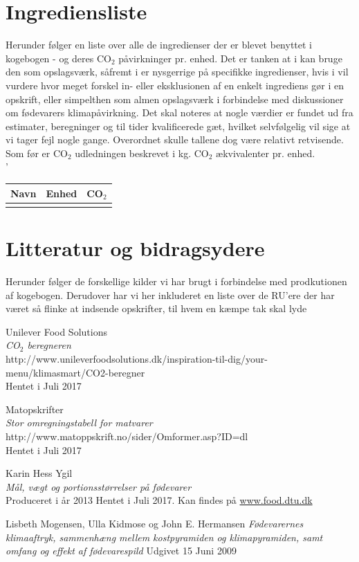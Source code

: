 \documentclass[11pt, a4paper]{article}
\newcommand{\coo}{CO$_2$ }
\begin{document}
\newpage

\section{Ingrediensliste}

Herunder følger en liste over alle de ingredienser der er blevet benyttet i kogebogen - og deres \coo påvirkninger pr. enhed. Det er tanken at i kan bruge den som opslagsværk, såfremt i er nysgerrige på specifikke ingredienser, hvis i vil vurdere hvor meget forskel in- eller eksklusionen af en enkelt ingrediens gør i en opskrift, eller simpelthen som almen opslagsværk i forbindelse med diskussioner om fødevarers klimapåvirkning. Det skal noteres at nogle værdier er fundet ud fra estimater, beregninger og til tider kvalificerede gæt, hvilket selvfølgelig vil sige at vi tager fejl nogle gange. Overordnet skulle tallene dog være relativt retvisende. Som før er \coo udledningen beskrevet i kg. \coo ækvivalenter pr. enhed.\\



'
	
	\begin{longtable}{|l|l|l|}
		\hline
\textbf{Navn} & \textbf{Enhed} & \textbf{\coo}\\ \hline
\rucooingredients		
	\end{longtable}

\newpage
\section{Litteratur og bidragsydere}

Herunder følger de forskellige kilder vi har brugt i forbindelse med prodkutionen af kogebogen. Derudover har vi her inkluderet en liste over de RU'ere der har været så flinke at indsende opskrifter, til hvem en kæmpe tak skal lyde

\begin{thebibliography}{9}
	Unilever Food Solutions\\
	\textit{\coo beregneren}\\
	http://www.unileverfoodsolutions.dk/inspiration-til-dig/your-menu/klimasmart/CO2-beregner\\
	Hentet i Juli 2017
	
	Matopskrifter\\
	\textit{Stor omregningstabell for matvarer}\\
	http://www.matoppskrift.no/sider/Omformer.asp?ID=dl\\
	Hentet i Juli 2017
	
 Karin Hess Ygil\\
	\textit{Mål, vægt og portionsstørrelser på fødevarer}\\
	Produceret i år 2013
	Hentet i Juli 2017. Kan findes på \url{www.food.dtu.dk}
	
	Lisbeth Mogensen, Ulla Kidmose og John E. Hermansen
	\textit{Fødevarernes klimaaftryk,
		sammenhæng mellem kostpyramiden og klimapyramiden,
		samt omfang og effekt af fødevarespild}
	Udgivet 15 Juni 2009
	
\end{thebibliography}
\end{document}
